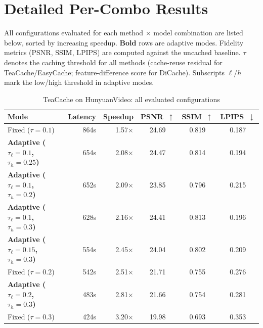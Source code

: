%

\appendix

\section{Detailed Per-Combo Results}
\label{sec:appendix-detailed}

All configurations evaluated for each method $\times$ model combination are listed
below, sorted by increasing speedup. \textbf{Bold} rows are adaptive modes.
Fidelity metrics (PSNR, SSIM, LPIPS) are computed against the uncached baseline.
$\tau$ denotes the caching threshold for all methods (cache-reuse residual for
TeaCache/EasyCache; feature-difference score for DiCache).
Subscripts $\ell$/$h$ mark the low/high threshold in adaptive modes.

\begin{table}[htbp]
\centering
\small
\setlength{\tabcolsep}{5pt}
\caption{TeaCache on HunyuanVideo: all evaluated configurations}
\label{tab:app-tc-hv}
\begin{tabular}{lrrccc}
\toprule
\textbf{Mode} & \textbf{Latency} & \textbf{Speedup} & \textbf{PSNR~$\uparrow$} & \textbf{SSIM~$\uparrow$} & \textbf{LPIPS~$\downarrow$} \\
\midrule
  Fixed ($\tau=0.1$) & 864s & 1.57$\times$ & 24.69 & 0.819 & 0.187 \\
  \textbf{Adaptive ($\tau_\ell=0.1$, $\tau_h=0.25$)} & 654s & 2.08$\times$ & 24.47 & 0.814 & 0.194 \\
  \textbf{Adaptive ($\tau_\ell=0.1$, $\tau_h=0.2$)} & 652s & 2.09$\times$ & 23.85 & 0.796 & 0.215 \\
  \textbf{Adaptive ($\tau_\ell=0.1$, $\tau_h=0.3$)} & 628s & 2.16$\times$ & 24.41 & 0.813 & 0.196 \\
  \textbf{Adaptive ($\tau_\ell=0.15$, $\tau_h=0.3$)} & 554s & 2.45$\times$ & 24.04 & 0.802 & 0.209 \\
  Fixed ($\tau=0.2$) & 542s & 2.51$\times$ & 21.71 & 0.755 & 0.276 \\
  \textbf{Adaptive ($\tau_\ell=0.2$, $\tau_h=0.3$)} & 483s & 2.81$\times$ & 21.66 & 0.754 & 0.281 \\
  Fixed ($\tau=0.3$) & 424s & 3.20$\times$ & 19.98 & 0.693 & 0.353 \\
\bottomrule
\end{tabular}
\end{table}

